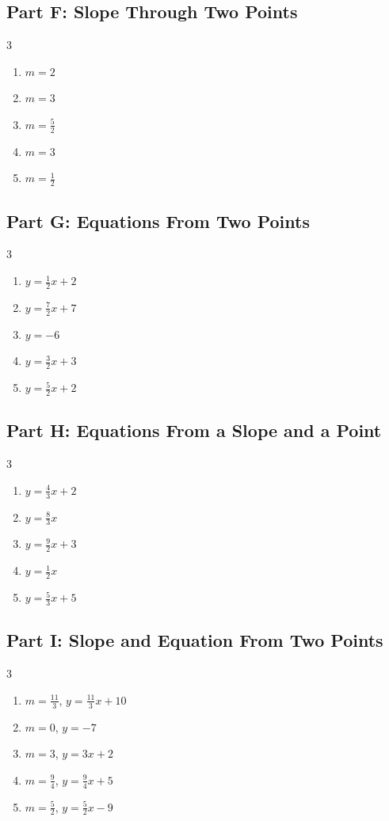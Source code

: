\documentclass[11pt]{article}
\begin{document}
\subsection*{Part F: Slope Through Two Points}
\begin{multicols}{3}
\begin{enumerate}
  \item $m = 2$
  \item $m = 3$
  \item $m = \frac{5}{2}$
  \item $m = 3$
  \item $m = \frac{1}{2}$
\end{enumerate}
\end{multicols}
\subsection*{Part G: Equations From Two Points}
\begin{multicols}{3}
\begin{enumerate}
  \item $y = \frac{1}{2}x + 2$
  \item $y = \frac{7}{2}x + 7$
  \item $y = -6$
  \item $y = \frac{3}{2}x + 3$
  \item $y = \frac{5}{2}x + 2$
\end{enumerate}
\end{multicols}
\subsection*{Part H: Equations From a Slope and a Point}
\begin{multicols}{3}
\begin{enumerate}
  \item $y = \frac{4}{3}x + 2$
  \item $y = \frac{8}{3}x$
  \item $y = \frac{9}{2}x + 3$
  \item $y = \frac{1}{2}x$
  \item $y = \frac{5}{3}x + 5$
\end{enumerate}
\end{multicols}
\subsection*{Part I: Slope and Equation From Two Points}
\begin{multicols}{3}
\begin{enumerate}
  \item $m = \frac{11}{3}$, \quad $y = \frac{11}{3}x + 10$
  \item $m = 0$, \quad $y = -7$
  \item $m = 3$, \quad $y = 3x + 2$
  \item $m = \frac{9}{4}$, \quad $y = \frac{9}{4}x + 5$
  \item $m = \frac{5}{2}$, \quad $y = \frac{5}{2}x - 9$
\end{enumerate}
\end{multicols}
\end{document}
